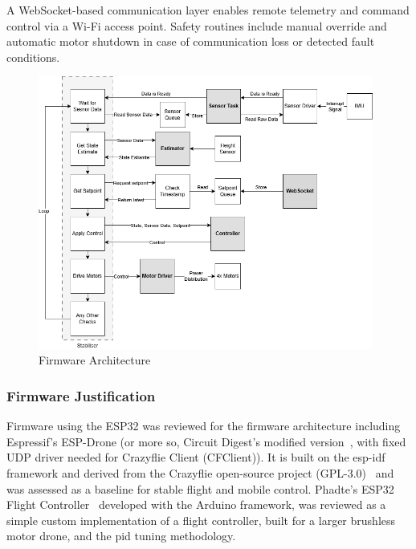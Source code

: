 A WebSocket-based communication layer enables remote telemetry and command control via a Wi-Fi access point. Safety routines include manual override and automatic motor shutdown in case of communication loss or detected fault conditions.

\begin{figure}[H]
    \centering
    \captionsetup{justification=centering, margin=1cm}
    \includegraphics[width=0.98\textwidth]{img/block-software-gray2.PNG}
    \caption{Firmware Architecture}
    \label{fig:block-software}
\end{figure}

\subsubsection{Firmware Justification}

Firmware using the ESP32 was reviewed for the firmware architecture including Espressif’s ESP-Drone (or more so, Circuit Digest’s modified version~\cite{espdrone_circuitdigest}, with fixed UDP driver needed for Crazyflie Client (CFClient)). It is built on the \gls{esp-idf} framework and derived from the Crazyflie open-source project (GPL-3.0)~\cite{bitcraze_crazyflie_firmware} and was assessed as a baseline for stable flight and mobile control. Phadte’s ESP32 Flight Controller~\cite{pratikphadte_flight_controller} developed with the Arduino framework, was reviewed as a simple custom implementation of a flight controller, built for a larger brushless motor drone, and the \gls{pid} tuning methodology.  

